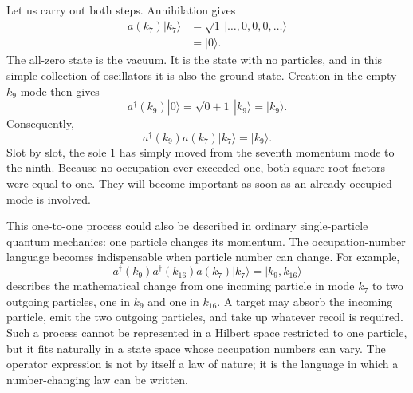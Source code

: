 \begin{classroomqa}
\end{classroomqa}

Let us carry out both steps. Annihilation gives
\begin{align}
a(k_7)|k_7\rangle
&=
\sqrt{1}\,|\ldots,0,0,0,\ldots\rangle\\
&=|0\rangle.
\end{align}
The all-zero state is the vacuum. It is the state with no particles, and in this simple collection of oscillators it is also the ground state. Creation in the empty \(k_9\) mode then gives
\begin{equation}
a^\dagger(k_9)|0\rangle
=\sqrt{0+1}\,|k_9\rangle
=|k_9\rangle.
\end{equation}
Consequently,
\begin{equation}
a^\dagger(k_9)a(k_7)|k_7\rangle=|k_9\rangle.
\end{equation}
Slot by slot, the sole \(1\) has simply moved from the seventh momentum mode to the ninth. Because no occupation ever exceeded one, both square-root factors were equal to one. They will become important as soon as an already occupied mode is involved.

This one-to-one process could also be described in ordinary single-particle quantum mechanics: one particle changes its momentum. The occupation-number language becomes indispensable when particle number can change. For example,
\begin{equation}
a^\dagger(k_9)a^\dagger(k_{16})a(k_7)|k_7\rangle
=|k_9,k_{16}\rangle
\end{equation}
describes the mathematical change from one incoming particle in mode \(k_7\) to two outgoing particles, one in \(k_9\) and one in \(k_{16}\). A target may absorb the incoming particle, emit the two outgoing particles, and take up whatever recoil is required. Such a process cannot be represented in a Hilbert space restricted to one particle, but it fits naturally in a state space whose occupation numbers can vary. The operator expression is not by itself a law of nature; it is the language in which a number-changing law can be written.


